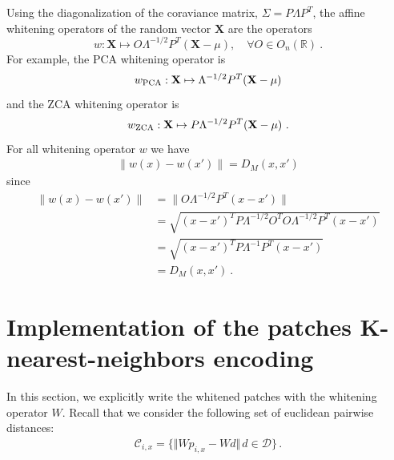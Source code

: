 \documentclass{article} %
\begin{document}
Using the diagonalization of the coraviance matrix,  $\Sigma = P\Lambda P^T$, the affine whitening operators of the random vector $\mathbf{X}$ are the operators 
\begin{equation}
\label{whitening}
     w : \mathbf{X} \mapsto O \Lambda^{-1/2} P^T (\mathbf{X} - \mu), \quad \forall O \in  O_n (\mathbb{R}) \ .
\end{equation}
For example, the PCA whitening operator is 
\begin{equation*}
     w_{\rm PCA} : \mathbf{X} \mapsto \Lambda^{-1/2} P^T (\mathbf{X} - \mu)
\end{equation*}
and the ZCA whitening operator is 
\begin{equation*}
     w_{\rm ZCA} : \mathbf{X} \mapsto P \Lambda^{-1/2} P^T (\mathbf{X} - \mu) \ .
\end{equation*}
For all whitening operator $w$ we have
\begin{align*}
\|w(x) - w(x')\| = D_M(x, x')
\end{align*}
since
\begin{align*}
  \|w(x) - w(x')\|
    &= \| O \Lambda^{-1/2} P^T ( x - x') \|\\
    &= \sqrt{(x - x')^T P \Lambda^{-1/2} O^T O \Lambda^{-1/2} P^T (x - x') }\\
    &=  \sqrt{ (x - x')^T P \Lambda^{-1} P^T (x - x')} \\
    &= D_M(x, x') \ .
\end{align*}

\section{Implementation of the patches K-nearest-neighbors  encoding}

In this section, we explicitly write the whitened patches with the whitening operator $W$.
Recall that  we consider the following set of euclidean pairwise distances:
\begin{align*}\mathcal{C}_{i, x} =\{\Vert W p_{i, x} - W d \Vert\, d\in\mathcal{D} \}\,.\end{align*}
\end{document}
